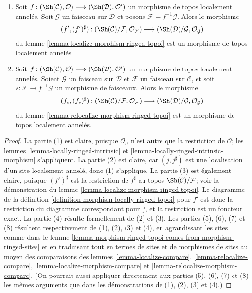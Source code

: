 \begin{lemma}
\begin{enumerate}
Soit $s : \mathcal{G} \to \mathcal{F}$ une application de faisceaux sur
$\mathcal{C}$. Alors le morphisme
$$
(j, j^\sharp) :
(\Sh(\mathcal{C})/\mathcal{G}, \mathcal{O}_\mathcal{G})
\longrightarrow
(\Sh(\mathcal{C})/\mathcal{F}, \mathcal{O}_\mathcal{F})
$$
du lemme \ref{lemma-relocalize-ringed-topos} est un morphisme de topos
localement annelés.
\item Soit
$f :
(\Sh(\mathcal{C}), \mathcal{O})
\longrightarrow
(\Sh(\mathcal{D}), \mathcal{O}')$
un morphisme de topos localement annelés. Soit $\mathcal{G}$ un faisceau sur
$\mathcal{D}$ et posons $\mathcal{F} = f^{-1}\mathcal{G}$. Alors le morphisme
$$
(f', (f')^\sharp) :
(\Sh(\mathcal{C})/\mathcal{F}, \mathcal{O}_\mathcal{F})
\longrightarrow
(\Sh(\mathcal{D})/\mathcal{G}, \mathcal{O}'_\mathcal{G})
$$
du lemme \ref{lemma-localize-morphism-ringed-topoi} est un morphisme de topos
localement annelés.
\item Soit
$f :
(\Sh(\mathcal{C}), \mathcal{O})
\longrightarrow
(\Sh(\mathcal{D}), \mathcal{O}')$
un morphisme de topos localement annelés. Soient $\mathcal{G}$ un faisceau sur
$\mathcal{D}$ et $\mathcal{F}$ un faisceau sur $\mathcal{C}$, et soit
$s : \mathcal{F} \to f^{-1}\mathcal{G}$ un morphisme de faisceaux. Alors le morphisme
$$
(f_s, (f_s)^\sharp) :
(\Sh(\mathcal{C})/\mathcal{F}, \mathcal{O}_\mathcal{F})
\longrightarrow
(\Sh(\mathcal{D})/\mathcal{G}, \mathcal{O}'_\mathcal{G})
$$
du lemme \ref{lemma-relocalize-morphism-ringed-topoi} est un morphisme de topos
localement annelés.
\end{enumerate}
\end{lemma}

\begin{proof}
La partie (1) est claire, puisque $\mathcal{O}_U$ n'est autre que la
restriction de $\mathcal{O}$; les lemmes
\ref{lemma-locally-ringed-intrinsic} et
\ref{lemma-locally-ringed-intrinsic-morphism} s'appliquent. La partie (2) est
claire, car $(j, j^\sharp)$ est une localisation d'un site localement annelé,
donc (1) s'applique. La partie (3) est également claire, puisque
$(f')^\sharp$ est la restriction de $f^\sharp$ au topos
$\Sh(\mathcal{C})/\mathcal{F}$; voir la démonstration du
lemme \ref{lemma-localize-morphism-ringed-topoi}. Le diagramme de la
définition \ref{definition-morphism-locally-ringed-topoi} pour $f'$ est donc
la restriction du diagramme correspondant pour $f$, et la restriction est un
foncteur exact. La partie (4) résulte formellement de (2) et (3). Les parties
(5), (6), (7) et (8) résultent respectivement de (1), (2), (3) et (4), en
agrandissant les sites comme dans le
lemme \ref{lemma-morphism-ringed-topoi-comes-from-morphism-ringed-sites} et en
traduisant tout en termes de sites et de morphismes de sites au moyen des comparaisons des lemmes
\ref{lemma-localize-compare},
\ref{lemma-relocalize-compare},
\ref{lemma-localize-morphism-compare} et
\ref{lemma-relocalize-morphism-compare}.
(On pourrait aussi appliquer directement aux parties (5), (6), (7) et (8) les
mêmes arguments que dans les démonstrations de (1), (2), (3) et (4).)
\end{proof}






